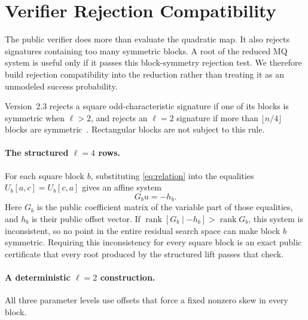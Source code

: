 \documentclass[11pt]{article}
\newcommand{\rank}{\operatorname{rank}}
\begin{document}
\section{Verifier Rejection Compatibility}\label{sec:rejection}

The public verifier does more than evaluate the quadratic map.  It also rejects
signatures containing too many symmetric blocks.  A root of the reduced MQ
system is useful only if it passes this block-symmetry rejection test.  We therefore build
rejection compatibility into the reduction rather than treating it as an
unmodeled success probability.

Version~2.3 rejects a square odd-characteristic signature if one of its blocks
is symmetric when $\ell>2$, and rejects an $\ell=2$ signature if more than
$\lfloor n/4\rfloor$ blocks are symmetric~\cite{SNOVA23}.  Rectangular blocks
are not subject to this rule.

\paragraph{The structured $\ell=4$ rows.}
For each square block $b$, substituting \eqref{eq:relation} into the equalities
$U_b[a,c]=U_b[c,a]$ gives an affine system
\begin{equation}\label{eq:rejection-affine}
 G_bu=-h_b.
\end{equation}
Here $G_b$ is the public coefficient matrix of the variable part of those
equalities, and $h_b$ is their public offset vector.
If $\rank[G_b\mid-h_b]>\rank G_b$, this system is inconsistent, so no point in
the entire residual search space can make block $b$ symmetric.  Requiring this
inconsistency for every square block is an exact public certificate that every
root produced by the structured lift passes that check.

\paragraph{A deterministic $\ell=2$ construction.}
All three parameter levels use offsets that force a fixed nonzero skew in
every block.
\end{document}
